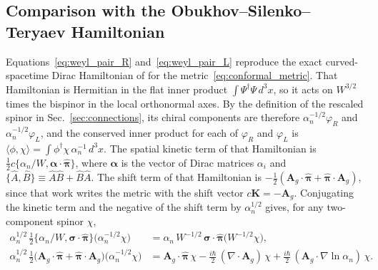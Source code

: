 \documentclass[aps,prd,onecolumn,tightenlines,nofootinbib,notitlepage,11pt,floatfix]{revtex4-2}
\theoremstyle{indentedtheorem}
\begin{document}
\subsection{Comparison with the Obukhov--Silenko--Teryaev Hamiltonian}
\label{sec:curved_slices}

Equations~\eqref{eq:weyl_pair_R} and~\eqref{eq:weyl_pair_L} reproduce the exact curved-spacetime Dirac Hamiltonian of \citet{ObukhovSilenkoTeryaev2011Dirac,ObukhovSilenkoTeryaev2013Spin} for the metric~\eqref{eq:conformal_metric}. That Hamiltonian is Hermitian in the flat inner product $\int\Psi^\dagger\Psi\,d^3x$, so it acts on $W^{3/2}$ times the bispinor in the local orthonormal axes. By the definition of the rescaled spinor in Sec.~\ref{sec:connections}, its chiral components are therefore $\alpha_n^{-1/2}\varphi_R$ and $\alpha_n^{-1/2}\varphi_L$, and the conserved inner product for each of $\varphi_R$ and $\varphi_L$ is $\langle\phi,\chi\rangle = \int\phi^\dagger\chi\,\alpha_n^{-1}\,d^3x$. The spatial kinetic term of that Hamiltonian is $\tfrac{1}{2}c\{\alpha_n/W,\boldsymbol{\alpha}\cdot\hat{\boldsymbol{\pi}}\}$, where $\boldsymbol{\alpha}$ is the vector of Dirac matrices $\alpha_i$ and $\{\hat{A},\hat{B}\}\equiv\hat{A}\hat{B}+\hat{B}\hat{A}$. The shift term of that Hamiltonian is $-\tfrac{1}{2}(\mathbf{A}_g\cdot\hat{\boldsymbol{\pi}} + \hat{\boldsymbol{\pi}}\cdot\mathbf{A}_g)$, since that work writes the metric with the shift vector $c\mathbf{K}=-\mathbf{A}_g$. Conjugating the kinetic term and the negative of the shift term by $\alpha_n^{1/2}$ gives, for any two-component spinor $\chi$,
\begin{align*}
    \alpha_n^{1/2}\,\tfrac{1}{2}\big\{\alpha_n/W,\boldsymbol{\sigma}\cdot\hat{\boldsymbol{\pi}}\big\}\big(\alpha_n^{-1/2}\chi\big) &= \alpha_n\,W^{-1/2}\,\boldsymbol{\sigma}\cdot\hat{\boldsymbol{\pi}}\big(W^{-1/2}\chi\big) , \\
    \alpha_n^{1/2}\,\tfrac{1}{2}\big(\mathbf{A}_g\cdot\hat{\boldsymbol{\pi}} + \hat{\boldsymbol{\pi}}\cdot\mathbf{A}_g\big)\big(\alpha_n^{-1/2}\chi\big) &= \mathbf{A}_g\cdot\hat{\boldsymbol{\pi}}\,\chi - \frac{i\hbar}{2}\,(\nabla\cdot\mathbf{A}_g)\,\chi + \frac{i\hbar}{2}\,(\mathbf{A}_g\cdot\nabla\ln\alpha_n)\,\chi .
\end{align*}
\end{document}
